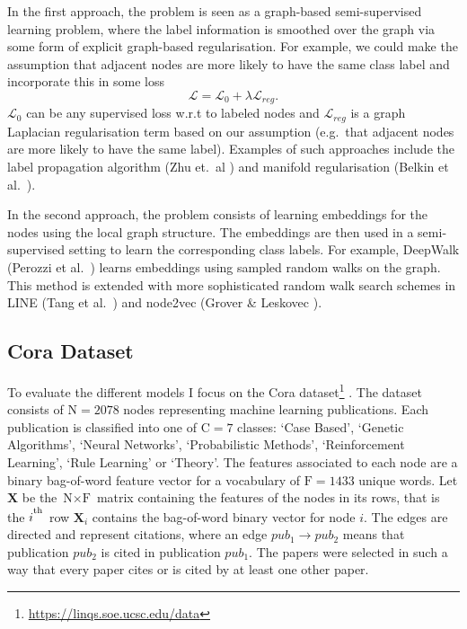 \documentclass[12pt]{article}
\theoremstyle{definition}
\begin{document}
\bigskip

In the first approach, the problem is seen as a graph-based semi-supervised learning problem, where the label information is smoothed over the graph via some form of explicit graph-based regularisation. For example, we could make the assumption that adjacent nodes are more likely to have the same class label and incorporate this in some loss
\begin{equation}
	\mathcal{L} = \mathcal{L}_0 + \lambda \mathcal{L}_{\mathit{reg}}.
\end{equation}
$\mathcal{L}_0$ can be any supervised loss w.r.t to labeled nodes and $\mathcal{L}_{\mathit{reg}}$ is a graph Laplacian regularisation term based on our assumption (e.g.\ that adjacent nodes are more likely to have the same label). Examples of such approaches include the label propagation algorithm (Zhu et.\ al \cite{zhu2002learning}) and manifold regularisation (Belkin et al.\ \cite{belkin2006manifold}).

\bigskip

In the second approach, the problem consists of learning embeddings for the nodes using the local graph structure. The embeddings are then used in a semi-supervised setting to learn the corresponding class labels. For example, DeepWalk (Perozzi et al.\ \cite{perozzi2014deepwalk}) learns embeddings using sampled random walks on the graph. This method is extended with more sophisticated random walk search schemes in LINE (Tang et al.\ \cite{tang2015line}) and node2vec (Grover \& Leskovec \cite{grover2016node2vec}).


\subsection{Cora Dataset}
To evaluate the different models I focus on the Cora dataset\footnote{\url{https://linqs.soe.ucsc.edu/data}} \cite{cora}. The dataset consists of $\textrm{N} = 2078$ nodes representing machine learning publications. Each publication is classified into one of $\textrm{C} = 7$ classes: `Case Based', `Genetic Algorithms', `Neural Networks', `Probabilistic Methods', `Reinforcement Learning', `Rule Learning' or `Theory'. The features associated to each node are a binary bag-of-word feature vector for a vocabulary of $\textrm{F} = 1433$ unique words. Let $\mathbf{X}$ be the $\textrm{N} \times \textrm{F}$ matrix containing the features of the nodes in its rows, that is the $i^\textsuperscript{th}$ row  $\mathbf{X}_i$ contains the bag-of-word binary vector for node $i$. The edges are directed and represent citations, where an edge $\mathit{pub_1} \to \mathit{pub_2}$ means that publication $\mathit{pub_2}$ is cited in publication $\mathit{pub_1}$. The papers were selected in such a way that every paper cites or is cited by at least one other paper. 
\end{document}
